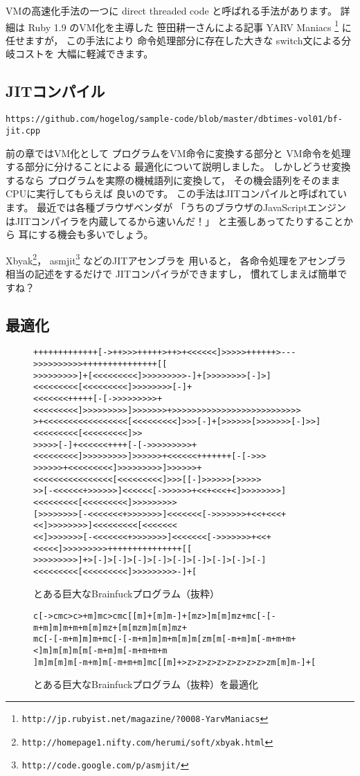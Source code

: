 VMの高速化手法の一つに
direct threaded code
と呼ばれる手法があります。
詳細は
Ruby 1.9
のVM化を主導した
笹田耕一さんによる記事
YARV Maniacs
\footnote{\verb|http://jp.rubyist.net/magazine/?0008-YarvManiacs|}
に任せますが，
この手法により
命令処理部分に存在した大きな
switch文による分岐コストを
大幅に軽減できます。

\subsection{JITコンパイル}
{\scriptsize
\verb|https://github.com/hogelog/sample-code/blob/master/dbtimes-vol01/bf-jit.cpp|
}

前の章ではVM化として
プログラムをVM命令に変換する部分と
VM命令を処理する部分に分けることによる
最適化について説明しました。
しかしどうせ変換するなら
プログラムを実際の機械語列に変換して，
その機会語列をそのままCPUに実行してもらえば
良いのです。
この手法はJITコンパイルと呼ばれています。
最近では各種ブラウザベンダが
「うちのブラウザのJavaScriptエンジンはJITコンパイラを内蔵してるから速いんだ！」
と主張しあってたりすることから
耳にする機会も多いでしょう。

Xbyak\footnote{
\verb|http://homepage1.nifty.com/herumi/soft/xbyak.html|
}，
asmjit\footnote{
\verb|http://code.google.com/p/asmjit/|
}
などのJITアセンブラを
用いると，
各命令処理をアセンブラ相当の記述をするだけで
JITコンパイラができますし，
慣れてしまえば簡単ですね？

\subsection{最適化}
\begin{figure}[hbt]
{\scriptsize
\begin{verbatim}
+++++++++++++[->++>>>+++++>++>+<<<<<<]>>>>>++++++>--->>>>>>>>>>+++++++++++++++[[
>>>>>>>>>]+[<<<<<<<<<]>>>>>>>>>-]+[>>>>>>>>[-]>]<<<<<<<<<[<<<<<<<<<]>>>>>>>>[-]+
<<<<<<<+++++[-[->>>>>>>>>+<<<<<<<<<]>>>>>>>>>]>>>>>>>+>>>>>>>>>>>>>>>>>>>>>>>>>>
>+<<<<<<<<<<<<<<<<<[<<<<<<<<<]>>>[-]+[>>>>>>[>>>>>>>[-]>>]<<<<<<<<<[<<<<<<<<<]>>
>>>>>[-]+<<<<<<++++[-[->>>>>>>>>+<<<<<<<<<]>>>>>>>>>]>>>>>>+<<<<<<+++++++[-[->>>
>>>>>>+<<<<<<<<<]>>>>>>>>>]>>>>>>+<<<<<<<<<<<<<<<<[<<<<<<<<<]>>>[[-]>>>>>>[>>>>>
>>[-<<<<<<+>>>>>>]<<<<<<[->>>>>>+<<+<<<+<]>>>>>>>>]<<<<<<<<<[<<<<<<<<<]>>>>>>>>>
[>>>>>>>>[-<<<<<<<+>>>>>>>]<<<<<<<[->>>>>>>+<<+<<<+<<]>>>>>>>>]<<<<<<<<<[<<<<<<<
<<]>>>>>>>[-<<<<<<<+>>>>>>>]<<<<<<<[->>>>>>>+<<+<<<<<]>>>>>>>>>+++++++++++++++[[
>>>>>>>>>]+>[-]>[-]>[-]>[-]>[-]>[-]>[-]>[-]>[-]<<<<<<<<<[<<<<<<<<<]>>>>>>>>>-]+[
\end{verbatim}
}
\caption{とある巨大なBrainfuckプログラム（抜粋）}
\label{mandelbrot.b}
\end{figure}
\begin{figure}[hbt]
{\scriptsize
\begin{verbatim}
c[->cmc>c>+m]mc>cmc[[m]+[m]m-]+[mz>]m[m]mz+mc[-[-m+m]m]m+m+m[m]mz+[m[mzm]m[m]mz+
mc[-[-m+m]m]m+mc[-[-m+m]m]m+m[m]m[zm[m[-m+m]m[-m+m+m+<]m]m[m]m[m[-m+m]m[-m+m+m+m
]m]m[m]m[-m+m]m[-m+m+m]mc[[m]+>z>z>z>z>z>z>z>z>zm[m]m-]+[
\end{verbatim}
}
\caption{とある巨大なBrainfuckプログラム（抜粋）を最適化}
\label{mandelbrot.b:opt}
\end{figure}

